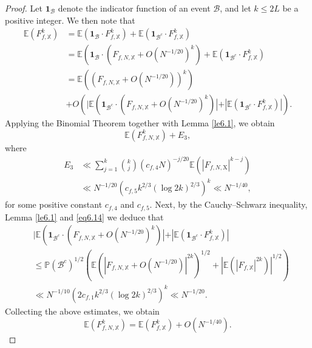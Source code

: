 \documentclass[10pt,leqno]{amsart}
\numberwithin{equation}{section}
\begin{document}
\begin{proof}
Let $\mathbf{1}_{\mathcal{B}}$ denote the indicator function of an event $\mathcal{B}$, and let $k \leqslant 2L$ be a positive integer. We then note that
\[
\begin{aligned}
\mathbb{E}\left(F_{f,\mathbb{X}}^k\right) & =\mathbb{E}\left(\mathbf{1}_{\mathcal{B}} \cdot F_{f,\mathbb{X}}^k\right)+\mathbb{E}\left(\mathbf{1}_{\mathcal{B}^c} \cdot F_{f,\mathbb{X}}^k\right) \\
& =\mathbb{E}\left(\mathbf{1}_{\mathcal{B}} \cdot\left(F_{f,N, \mathbb{X}}+O\left(N^{-1 / 20}\right)^k\right)+\mathbb{E}\left(\mathbf{1}_{\mathcal{B}^c} \cdot F_{f,\mathbb{X}}^k\right)\right. \\
& =\mathbb{E}\left(\left(F_{f,N, \mathbb{X}}+O\left(N^{-1 / 20}\right)\right)^k\right)\\
&+O\left(\mid \mathbb{E}\left(\mathbf{1}_{\mathcal{B}^c} \cdot\left(F_{f,N, \mathbb{X}}+O\left(N^{-1 / 20}\right)^k\right)\left|+\left|\mathbb{E}\left(\mathbf{1}_{\mathcal{B}^c} \cdot F_{f,\mathbb{X}}^k\right)\right|\right.\right.\right) .
\end{aligned}
\]
 Applying the Binomial Theorem together with Lemma \ref{le6.1}, we obtain
\[
\mathbb{E}\left(F_{f,N, \mathbb{X}}^k\right)+E_3,
\]
where
\[
\begin{aligned}
    E_3 &\ll \sum_{j=1}^k\binom{k}{j}\left(c_{f,4} N\right)^{-j / 20} \mathbb{E}\left(\left|F_{f,N, \mathrm{X}}\right|^{k-j}\right)\\
    &\ll N^{-1 / 20}\left(c_{f,5} k^{2 / 3}\left(\log 2k\right)^{2/3}\right)^k \ll N^{-1 / 40},
\end{aligned}
\]
for some positive constant $c_{f,4}$ and $c_{f,5}$. Next, by the Cauchy--Schwarz inequality, Lemma \ref{le6.1} and  \eqref{eq6.14} we deduce that
\[
\begin{aligned}
& \mid \mathbb{E}\left(\boldsymbol{1}_{\mathcal {B}^{c}}\cdot (F_{f, N,\mathbb{X}}+O(N^{-1/20} )^{k} ) \left|+\left|\mathbb{E}\left(\mathbf{1}_{\mathcal{B}^c} \cdot F_{f,\mathbb{X}}^k\right)\right|\right.\right. \\
& \leqslant \mathbb{P}\left(\mathcal{B}^c\right)^{1 / 2}\left(\mathbb{E}\left(\left|F_{f,N, \mathbb{X}}+O\left(N^{-1/20}\right)\right|^{2 k}\right)^{1 / 2}+\left|\mathbb{E}\left(\left|F_{f,\mathbb{X}}\right|^{2 k}\right)\right|^{1 / 2}\right) \\
& \ll N^{-1 / 10}\left(2c_{f,1} k^{2 / 3}\left(\log 2k\right)^{2/3}\right)^k \ll N^{-1 / 20} .
\end{aligned}
\]
Collecting the above estimates, we obtain
\[
\mathbb{E}\left(F_{f,N, \mathbb{X}}^k\right)=\mathbb{E}\left(F_{f,\mathbb{X}}^k\right)+O\left(N^{-1 / 40}\right) .
\]
\end{proof}
\end{document}
